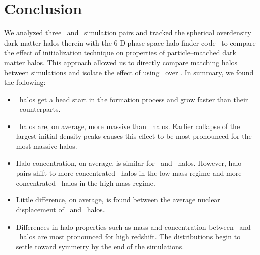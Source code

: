 
%
%

\section{Conclusion}
\label{sec:conclusion}



We analyzed three \lpt\ and \za\ simulation pairs and tracked the spherical overdensity dark matter halos therein with the 6-D phase space halo finder code \rockstar\ to compare the effect of initialization technique on properties of particle--matched dark matter halos.  This approach allowed us to directly compare matching halos between simulations and isolate the effect of using \lpt\ over \za.  In summary, we found the following:

\begin{itemize}
	\item \lpt\ halos get a head start in the formation process and grow faster than their \za\ counterparts.
	\item \lpt\ halos are, on average, more massive than \za\ halos.  Earlier collapse of the largest initial density peaks causes this effect to be most pronounced for the most massive halos.
	\item Halo concentration, on average, is similar for \lpt\ and \za\ halos.  However, halo pairs shift to more concentrated \lpt\ halos in the low mass regime and more concentrated \za\ halos in the high mass regime.
	\item Little difference, on average, is found between the average nuclear displacement of \lpt\ and \za\ halos.
	\item Differences in halo properties such as mass and concentration between \lpt\ and \za\ halos are most pronounced for high redshift.  The distributions begin to settle toward symmetry by the end of the simulations.
\end{itemize}




